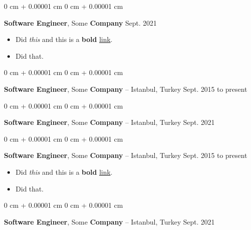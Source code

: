 \documentclass[10pt, letterpaper]{article}
\newenvironment{highlights}{
    \begin{itemize}[
        topsep=0.10 cm,
        parsep=0.10 cm,
        partopsep=0pt,
        itemsep=0pt,
        leftmargin=0 cm + 10pt
    ]
}{
    \end{itemize}
        
    \vspace{-0.20cm}
} %
\newenvironment{onecolentry}{
    \begin{adjustwidth}{
        0 cm + 0.00001 cm
    }{
        0 cm + 0.00001 cm
    }
}{
    \end{adjustwidth}
} %
\begin{document}
        \begin{onecolentry}
            \textbf{Software Engineer}, Some \textbf{Company} \hfill Sept. 2021
            \begin{highlights}
                \item Did \textit{this} and this is a \textbf{bold} \href{https://example.com}{link}.
                \item Did that.
            \end{highlights}
        \end{onecolentry}

        \vspace{0.1 cm}

        \begin{onecolentry}
            \textbf{Software Engineer}, Some \textbf{Company} -- Istanbul, Turkey \hfill Sept. 2015 to present
        \end{onecolentry}

        \vspace{0.1 cm}

        \begin{onecolentry}
            \textbf{Software Engineer}, Some \textbf{Company} -- Istanbul, Turkey \hfill Sept. 2021
        \end{onecolentry}

        \vspace{0.1 cm}

        \begin{onecolentry}
            \textbf{Software Engineer}, Some \textbf{Company} -- Istanbul, Turkey \hfill Sept. 2015 to present
            \begin{highlights}
                \item Did \textit{this} and this is a \textbf{bold} \href{https://example.com}{link}.
                \item Did that.
            \end{highlights}
        \end{onecolentry}

        \vspace{0.1 cm}

        \begin{onecolentry}
            \textbf{Software Engineer}, Some \textbf{Company} -- Istanbul, Turkey \hfill Sept. 2021
        \end{onecolentry}

        \vspace{0.1 cm}
\end{document}
